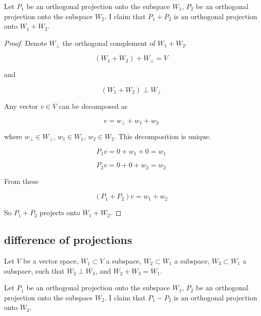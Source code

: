 \documentclass{article}
\begin{document}
\begin{appendices}
Let $P_1$ be an orthogonal projection onto the subspace $W_1$, $P_2$ be an orthogonal projection onto the subspace $W_2$. I claim that $P_1 + P_2$ is an orthogonal projection onto $W_1 + W_2$.

\begin{proof}

Denote $W_{\perp}$ the orthogonal complement of $W_1+W_2$.

\begin{equation}
    (W_1 + W_2) + W_{\perp} = V
\end{equation}

and

\begin{equation}
    (W_1 + W_2) \perp W_{\perp}
\end{equation}

Any vector $v \in V$ can be decomposed as

\begin{equation}
    v = w_{\perp} + w_1 + w_2
\end{equation}

where $w_{\perp} \in W_{\perp}$, $w_1 \in W_1$, $w_2 \in W_2$. This decomposition is unique.

\begin{equation}
    P_1 v = 0 + w_1 + 0 = w_1
\end{equation}

\begin{equation}
    P_2 v = 0 + 0 + w_2 = w_2
\end{equation}

From these

\begin{equation}
    (P_1 + P_2) v = w_1 + w_2
\end{equation}

So $P_1 + P_2$ projects onto $W_1 + W_2$.

\end{proof}


\subsection{difference of projections} \label{app:diff_proj}

Let $V$ be a vector space, $W_1 \subset V$ a subspace, $W_2 \subset W_1$ a subspace, $W_3 \subset W_1$ a subspace, such that $W_2 \perp W_3$, and $W_2 + W_3 = W_1$.

Let $P_1$ be an orthogonal projection onto the subspace $W_1$, $P_2$ be an orthogonal projection onto the subspace $W_2$. I claim that $P_1 - P_2$ is an orthogonal projection onto $W_3$.


\end{appendices}
\end{document}
